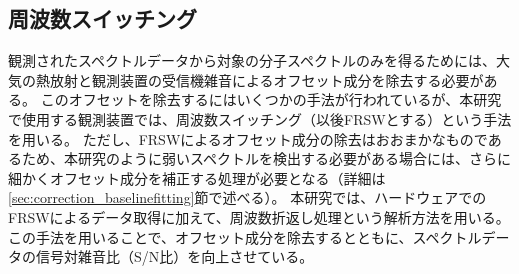 \subsection{周波数スイッチング}
\label{ssec:obs_frsw}
観測されたスペクトルデータから対象の分子スペクトルのみを得るためには、大気の熱放射と観測装置の受信機雑音によるオフセット成分を除去する必要がある。
このオフセットを除去するにはいくつかの手法が行われているが、本研究で使用する観測装置では、周波数スイッチング（以後FRSWとする）という手法を用いる。
ただし、FRSWによるオフセット成分の除去はおおまかなものであるため、本研究のように弱いスペクトルを検出する必要がある場合には、さらに細かくオフセット成分を補正する処理が必要となる（詳細は\ref{sec:correction_baselinefitting}節で述べる）。
本研究では、ハードウェアでのFRSWによるデータ取得に加えて、周波数折返し処理という解析方法を用いる。
この手法を用いることで、オフセット成分を除去するとともに、スペクトルデータの信号対雑音比（S/N比）を向上させている。\par

